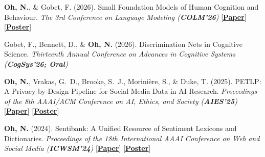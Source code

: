 \documentclass[10pt]{article}
\newlength{\labelw}\setlength{\labelw}{123pt}
\newlength{\colgap}\setlength{\colgap}{3pt}
\newlength{\contentw}\setlength{\contentw}{381pt}
\newcommand{\lblfont}{\fontsize{7.5}{9.5}\selectfont}
\newcommand{\lbl}[1]{{\lblfont\textls[90]{#1}}}
\newcommand{\plink}[2]{[\href{#1}{\textcolor{linkblue}{\uline{\textbf{#2}}}}]} %
\newcommand{\secrule}{\par\needspace{48pt}\vspace{11pt}\noindent{\color{textcol}\rule{\textwidth}{0.75pt}}\par\vspace{10pt}\nopagebreak}
\newcommand{\cvrow}[2]{\noindent\begin{minipage}[t]{\labelw}\raggedright\lbl{#1}\end{minipage}\hspace{\colgap}%
\begin{minipage}[t]{\contentw}#2\end{minipage}\par}
\newcommand{\controw}[1]{\vspace{10pt}\noindent\hspace{\labelw}\hspace{\colgap}%
\begin{minipage}[t]{\contentw}#1\end{minipage}\par}
\begin{document}
\secrule
\cvrow{CONFERENCE\\PROCEEDINGS}{%
\textbf{Oh, N.}, \& Gobet, F. (2026). Small Foundation Models of Human Cognition and Behaviour. \textit{The 3rd Conference on Language Modeling (\textbf{COLM'26})} \plink{https://arxiv.org/abs/2608.05224}{Paper} \plink{https://nick-sh-oh.github.io/pdf/smallcogfm_poster.pdf}{Poster}}
\controw{%
Gobet, F., Bennett, D., \& \textbf{Oh, N.} (2026). Discrimination Nets in Cognitive Science. \textit{Thirteenth Annual Conference on Advances in Cognitive Systems (\textbf{CogSys'26; Oral})}}
\controw{%
\textbf{Oh, N.}, Vrakas, G.~D., Brooke, S.~J., Morini\`ere, S., \& Duke, T. (2025). PETLP: A Privacy-by-Design Pipeline for Social Media Data in AI Research. \textit{Proceedings of the 8th AAAI/ACM Conference on AI, Ethics, and Society (\textbf{AIES'25})} \plink{https://doi.org/10.1609/aies.v8i2.36685}{Paper} \plink{https://nick-sh-oh.github.io/pdf/PETLP_poster.pdf}{Poster}}
\controw{%
\textbf{Oh, N.} (2024). Sentibank: A Unified Resource of Sentiment Lexicons and Dictionaries. \textit{Proceedings of the 18th International AAAI Conference on Web and Social Media (\textbf{ICWSM'24})} \plink{https://doi.org/10.1609/icwsm.v18i1.31443}{Paper} \plink{https://nick-sh-oh.github.io/pdf/sentibank_poster.pdf}{Poster}}
\end{document}
